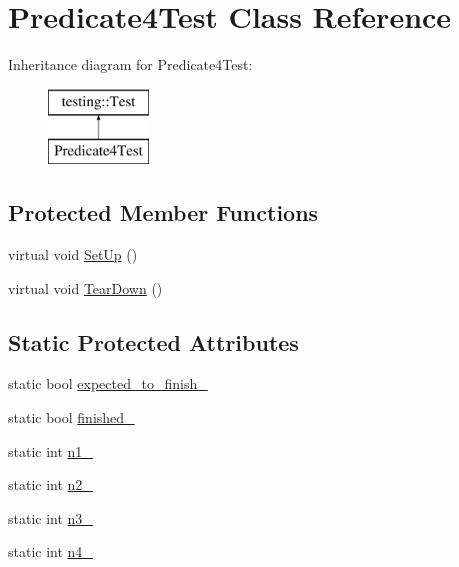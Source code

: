 \hypertarget{class_predicate4_test}{}\section{Predicate4\+Test Class Reference}
\label{class_predicate4_test}
Inheritance diagram for Predicate4\+Test\+:\begin{figure}[H]
\begin{center}
\leavevmode
\includegraphics[height=2.000000cm]{class_predicate4_test}
\end{center}
\end{figure}
\subsection*{Protected Member Functions}
\begin{DoxyCompactItemize}
\item 
virtual void \hyperlink{class_predicate4_test_afcf9db5dc68e97291813cdfeb2aaa5d2}{Set\+Up} ()
\item 
virtual void \hyperlink{class_predicate4_test_ab61983a4cdf3657b02bc2b81b67729c4}{Tear\+Down} ()
\end{DoxyCompactItemize}
\subsection*{Static Protected Attributes}
\begin{DoxyCompactItemize}
\item 
static bool \hyperlink{class_predicate4_test_a20600b5eda187c42ce4e812e77269654}{expected\+\_\+to\+\_\+finish\+\_\+}
\item 
static bool \hyperlink{class_predicate4_test_acfd174bf9dfb5a91afbcdca17e797888}{finished\+\_\+}
\item 
static int \hyperlink{class_predicate4_test_a8eb30cd283e613f7a2e501a3969be9ae}{n1\+\_\+}
\item 
static int \hyperlink{class_predicate4_test_a088fce743c747e3851c926cb3a87fda3}{n2\+\_\+}
\item 
static int \hyperlink{class_predicate4_test_a00ae6ae54c7d6639d448c036aedb6114}{n3\+\_\+}
\item 
static int \hyperlink{class_predicate4_test_ae42e23ce11e3f1c6b813496d6180cc67}{n4\+\_\+}
\end{DoxyCompactItemize}
